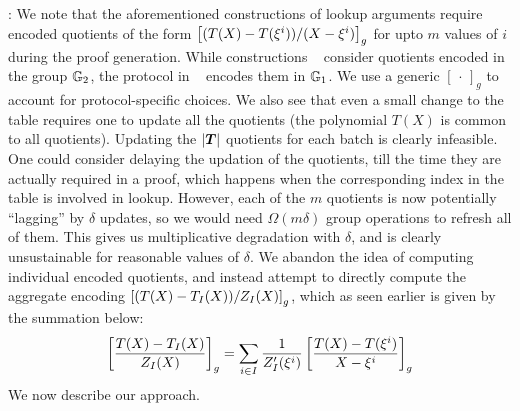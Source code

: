 : We note that the aforementioned constructions of lookup arguments require encoded quotients
of the form $\left[{(T(X)-T(\xi^i))/(X-\xi^i)}\right]_g$ for upto $m$ values of $i$ during the proof generation. While constructions ~\cite{CCS:ZBKMNS22,EPRINT:PosKat22}
consider quotients encoded in the group $\mathbb{G}_2$, the protocol in ~\cite{EPRINT:EagFioGab22} encodes them in $\mathbb{G}_1$. We use a generic $[\,\cdot\,]_g$ to
account for protocol-specific choices. We also see that even a small change to the table requires one to update all the quotients (the polynomial $T(X)$ is
common to all quotients). Updating the $|\vecT|$ quotients for each batch is clearly infeasible. One could consider delaying the updation of the quotients, till
the time they are actually required in a proof, which happens when the corresponding index in the table is involved in lookup. However, each of the $m$ quotients
is now potentially ``lagging'' by $\delta$ updates, so we would need $\Omega(m\delta)$ group operations to refresh all of them. This gives us multiplicative degradation
with $\delta$, and is clearly unsustainable for reasonable values of $\delta$. We abandon the idea of computing individual encoded quotients, and instead attempt
to directly compute the aggregate encoding $\left[{(T(X)-T_I(X))/Z_I(X)}\right]_g$, which as seen earlier is given by the summation below:
\begin{equation}\label{eq:encoded-quotient}
\left[{\frac{T(X)-T_I(X)}{Z_I(X)}}\right]_g = \sum_{i\in I}\frac{1}{Z_I'(\xi^i)}\left[{\frac{T(X)-T(\xi^i)}{X-\xi^i}}\right]_g
\end{equation}
We now describe our approach.

